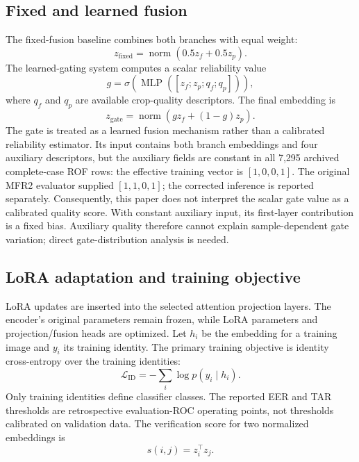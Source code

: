 \documentclass[10pt,journal,compsoc]{IEEEtran}
\begin{document}
\subsection{Fixed and learned fusion}
The fixed-fusion baseline combines both branches with equal weight:
\begin{equation}
 z_{\mathrm{fixed}}=\operatorname{norm}(0.5z_f+0.5z_p).
\end{equation}
The learned-gating system computes a scalar reliability value
\begin{equation}
 g=\sigma\left(\operatorname{MLP}([z_f;z_p;q_f;q_p])\right),
\end{equation}
where $q_f$ and $q_p$ are available crop-quality descriptors. The final embedding is
\begin{equation}
 z_{\mathrm{gate}}=\operatorname{norm}(gz_f+(1-g)z_p).
\end{equation}
The gate is treated as a learned fusion mechanism rather than a calibrated reliability estimator. Its input contains both branch embeddings and four auxiliary descriptors, but the auxiliary fields are constant in all 7,295 archived complete-case ROF rows: the effective training vector is $[1,0,0,1]$. The original MFR2 evaluator supplied $[1,1,0,1]$; the corrected inference is reported separately. Consequently, this paper does not interpret the scalar gate value as a calibrated quality score. With constant auxiliary input, its first-layer contribution is a fixed bias. Auxiliary quality therefore cannot explain sample-dependent gate variation; direct gate-distribution analysis is needed.

\subsection{LoRA adaptation and training objective}
LoRA updates are inserted into the selected attention projection layers. The encoder's original parameters remain frozen, while LoRA parameters and projection/fusion heads are optimized. Let $h_i$ be the embedding for a training image and $y_i$ its training identity. The primary training objective is identity cross-entropy over the training identities:
\begin{equation}
 \mathcal{L}_{\mathrm{ID}}=-\sum_i\log p(y_i\mid h_i).
\end{equation}
Only training identities define classifier classes. The reported EER and TAR thresholds are retrospective evaluation-ROC operating points, not thresholds calibrated on validation data. The verification score for two normalized embeddings is
\begin{equation}
 s(i,j)=z_i^\top z_j.
\end{equation}
\end{document}
